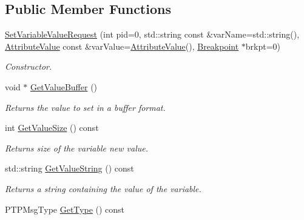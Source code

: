 \subsection*{Public Member Functions}
\begin{DoxyCompactItemize}
\item 
\hyperlink{class_common_1_1_set_variable_value_request_ad7af1a5cfccd93ac5859b4cfea28faf2}{Set\-Variable\-Value\-Request} (int pid=0, std\-::string const \&var\-Name=std\-::string(), \hyperlink{class_common_1_1_attribute_value}{Attribute\-Value} const \&var\-Value=\hyperlink{class_common_1_1_attribute_value}{Attribute\-Value}(), \hyperlink{class_common_1_1_breakpoint}{Breakpoint} $\ast$brkpt=0)
\begin{DoxyCompactList}\small\item\em Constructor. \end{DoxyCompactList}\item 
void $\ast$ \hyperlink{class_common_1_1_set_variable_value_request_ad63b5427198d580bef9f629363ab045f}{Get\-Value\-Buffer} ()
\begin{DoxyCompactList}\small\item\em Returns the value to set in a buffer format. \end{DoxyCompactList}\item 
\hypertarget{class_common_1_1_set_variable_value_request_a5434cdd52cae3ff0ab16af13ac2e6a48}{int \hyperlink{class_common_1_1_set_variable_value_request_a5434cdd52cae3ff0ab16af13ac2e6a48}{Get\-Value\-Size} () const }\label{class_common_1_1_set_variable_value_request_a5434cdd52cae3ff0ab16af13ac2e6a48}

\begin{DoxyCompactList}\small\item\em Returns size of the variable new value. \end{DoxyCompactList}\item 
\hypertarget{class_common_1_1_set_variable_value_request_a2a911a1fab2d7c2cdda79d409a252787}{std\-::string \hyperlink{class_common_1_1_set_variable_value_request_a2a911a1fab2d7c2cdda79d409a252787}{Get\-Value\-String} () const }\label{class_common_1_1_set_variable_value_request_a2a911a1fab2d7c2cdda79d409a252787}

\begin{DoxyCompactList}\small\item\em Returns a string containing the value of the variable. \end{DoxyCompactList}\item 
\hypertarget{class_common_1_1_set_variable_value_request_acf9a8861376f922212feeafe2fd964a6}{P\-T\-P\-Msg\-Type \hyperlink{class_common_1_1_set_variable_value_request_acf9a8861376f922212feeafe2fd964a6}{Get\-Type} () const }\label{class_common_1_1_set_variable_value_request_acf9a8861376f922212feeafe2fd964a6}


\end{DoxyCompactItemize}
